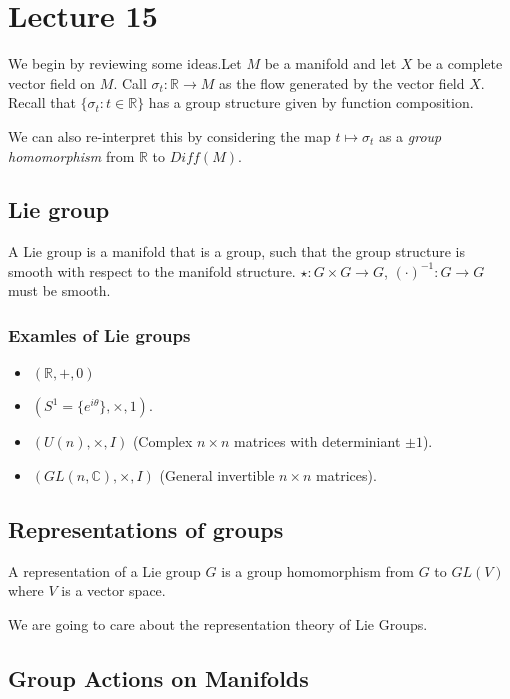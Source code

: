\documentclass[11pt]{book}
\newcommand{\R}{\ensuremath{\mathbb R}}
\begin{document}
\chapter{Lecture 15}
We begin by reviewing some ideas.Let $M$ be a manifold and let $X$ be a
complete vector field on $M$. Call $\sigma_t: \R \rightarrow M$ as the flow generated
by the vector field $X$. Recall that $\{ \sigma_t : t \in \mathbb R \}$ has a group structure
given by function composition.

We can also re-interpret this by considering the map $t \mapsto \sigma_t$ as
a \emph{group homomorphism} from $\R$ to $Diff(M)$.

\section{Lie group}

A Lie group is a manifold that is a group, such that the group structure
is smooth with respect to the manifold structure. $\star: G \times G \rightarrow G$,
$(\cdot)^{-1}: G \rightarrow G$ must be smooth.

\subsection{Examles of Lie groups}

\begin{itemize}
    \item $(\R, +, 0)$
    \item $(S^1 = \{ e^{i \theta} \}, \times, 1)$.
    \item $(U(n), \times, I)$ (Complex $n \times n$ matrices with determiniant $\pm 1$).
    \item $(GL(n, \mathbb C), \times, I)$ (General invertible $n \times n$ matrices).
\end{itemize}

\section{Representations of groups}

A representation of a Lie group $G$ is a group homomorphism
from $G$ to $GL(V)$ where $V$ is a vector space.

We are going to care about the representation theory of Lie Groups.

\section{Group Actions on Manifolds}
\end{document}
